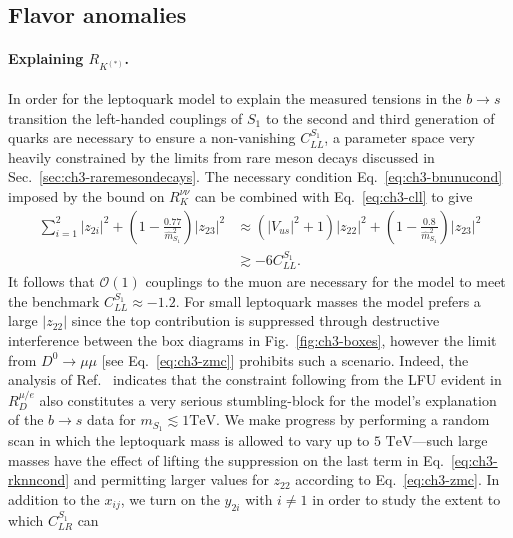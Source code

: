 \subsection{Flavor anomalies}

\paragraph{Explaining $R_{K^{(*)}}$.} In order for the leptoquark model to
explain the measured tensions in the $b \to s$ transition the left-handed
couplings of $S_{1}$ to the second and third generation of quarks are necessary
to ensure a non-vanishing $C_{LL}^{S_{1}}$, a parameter space very heavily
constrained by the limits from rare meson decays discussed in
Sec.~\ref{sec:ch3-raremesondecays}. The necessary condition Eq.~\eqref{eq:ch3-bnunucond}
imposed by the bound on $R_K^{\nu\nu}$ can be combined with Eq.~\eqref{eq:ch3-cll}
to give~\cite{Bauer:2015knc}
\begin{equation} \label{eq:ch3-rknncond}
  \begin{split}
    \sum_{i=1}^2 |z_{2i}|^2 + \left( 1 - \frac{0.77}{\hat{m}_{S_{1}}^2}
    \right) |z_{23}|^2 &\approx \left(|V_{us}|^2 + 1\right) |z_{22}|^2 +
    \left( 1 - \frac{0.8}{\hat{m}_{S_{1}}^2} \right) |z_{23}|^2\\ &\gtrsim - 6
    C_{LL}^{S_{1}}.
  \end{split}
\end{equation}
It follows that $\mathscr{O}(1)$ couplings to the muon are necessary for the
model to meet the benchmark $C_{LL}^{S_{1}} \approx -1.2$. For small leptoquark
masses the model prefers a large $|z_{22}|$ since the top contribution is
suppressed through destructive interference between the box diagrams in
Fig.~\ref{fig:ch3-boxes}, however the limit from $D^0 \to \mu \mu$ [see
Eq.~\eqref{eq:ch3-zmc}] prohibits such a scenario. Indeed, the analysis of
Ref.~\cite{Becirevic:2016oho} indicates that the constraint following from the
LFU evident in $R_D^{\mu/e}$ also constitutes a very serious stumbling-block for
the model's explanation of the $b \to s$ data for $m_{S_{1}} \lesssim 1 \text{
  TeV}$. We make progress by performing a random scan in which the leptoquark
mass is allowed to vary up to $5 \text{ TeV}$---such large masses have the
effect of lifting the suppression on the last term in
Eq.~\eqref{eq:ch3-rknncond} and permitting larger values for $z_{22}$ according
to Eq.~\eqref{eq:ch3-zmc}. In addition to the $x_{ij}$, we turn on the $y_{2i}$
with $i \neq 1$ in order to study the extent to which $C_{LR}^{S_{1}}$ can
